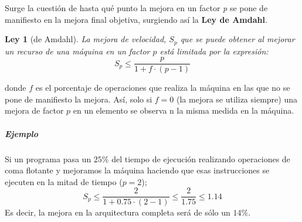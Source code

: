 \documentclass[12pt,spanish]{article}
\newtheorem{law}{Ley}
\begin{document}
Surge la cuestión de hasta qué punto la mejora en un factor \emph{p} se pone de manifiesto en la mejora final objetiva, surgiendo así la \textbf{Ley de Amdahl}.
\begin{law}[de Amdahl]
La mejora de velocidad, $S_p$ que se puede obtener al mejorar un recurso de una máquina en un factor $p$ está limitada por la expresión:
\[ S_p \leq \frac{p}{1 + f \cdot (p-1)} \]
\end{law}
donde $f$ es el porcentaje de operaciones que realiza la máquina en las que no se pone de manifiesto la mejora. Así, solo si $f=0$ (la mejora se utiliza siempre) una mejora de factor $p$ en un elemento se observa n la misma medida en la máquina.
\subparagraph{Ejemplo}
Si un programa pasa un $25\%$ del tiempo de ejecución realizando operaciones de coma flotante y mejoramos la máquina haciendo que esas instrucciones se ejecuten en la mitad de tiempo ($p=2$);
\[ S_p \leq \frac{2}{1 + 0.75 \cdot (2-1)} \leq \frac{2}{1.75} \leq 1.14\]
Es decir, la mejora en la arquitectura completa será de sólo un $14\%$.
\end{document}
